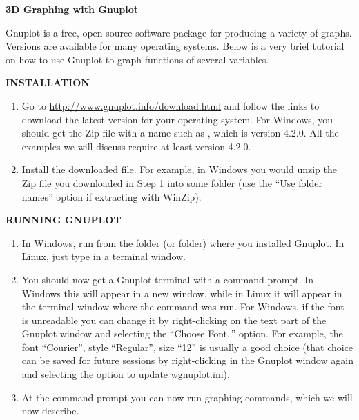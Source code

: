 \textsf{\textbf{\Large 3D Graphing with Gnuplot}}\vspace{4mm}

Gnuplot is a free, open-source software package for producing a variety of graphs. Versions are available for many
operating systems. Below is a very brief tutorial on how to use Gnuplot to graph functions of several
variables.\vspace{4mm}

\par\noindent\textbf{INSTALLATION}
\begin{enumerate}
 \item Go to \url{http://www.gnuplot.info/download.html} and follow the links to download the latest version for your
  operating system. For Windows, you should get the Zip file with a name such as , which is
  version 4.2.0. 
  All the examples we will discuss require at least version 4.2.0.
 \item Install the downloaded file. 
 For example, in Windows you would unzip the Zip file you downloaded
  in Step 1 into some folder (use the ``Use folder names'' option if extracting with WinZip).
\end{enumerate}

\par\noindent\textbf{RUNNING GNUPLOT}
\begin{enumerate}
 \item In Windows, run \textbf{} from the folder (or  folder)
  where you installed Gnuplot. In Linux, just type
  \textbf{} in a terminal window.
 \item You should now get a Gnuplot terminal with a \textbf{} command prompt. In Windows this
  will appear
  in a new window, while in Linux it will appear in the terminal window where the \textbf{} command was
  run. For Windows, if the font is unreadable you can change it by right-clicking on the text part of the Gnuplot window
  and selecting the ``Choose Font..'' option. For example, the font ``Courier'', style ``Regular'', size ``12'' is
  usually a
  good choice (that choice can be saved for future sessions by right-clicking in the Gnuplot window again and selecting
  the option to update wgnuplot.ini).
 \item At the \textbf{} command prompt you can now run graphing commands, which we will now
  describe.
\end{enumerate}

